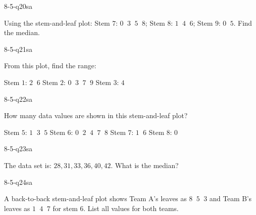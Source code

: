 \begin{practiceQuestion}{8-5-q20}{sa}
\begin{questionText}
Using the stem-and-leaf plot: Stem $7$: $0\;\;3\;\;5\;\;8$; Stem $8$: $1\;\;4\;\;6$; Stem $9$: $0\;\;5$. Find the median.
\end{questionText}
\end{practiceQuestion}

\begin{practiceQuestion}{8-5-q21}{sa}
\begin{questionText}
From this plot, find the range:

Stem $1$: $2\;\;6$ \quad Stem $2$: $0\;\;3\;\;7\;\;9$ \quad Stem $3$: $4$
\end{questionText}
\end{practiceQuestion}

\begin{practiceQuestion}{8-5-q22}{sa}
\begin{questionText}
How many data values are shown in this stem-and-leaf plot?

Stem $5$: $1\;\;3\;\;5$ \quad Stem $6$: $0\;\;2\;\;4\;\;7\;\;8$ \quad Stem $7$: $1\;\;6$ \quad Stem $8$: $0$
\end{questionText}
\end{practiceQuestion}

\begin{practiceQuestion}{8-5-q23}{sa}
\begin{questionText}
The data set is: $28, 31, 33, 36, 40, 42$. What is the median?
\end{questionText}
\end{practiceQuestion}

\begin{practiceQuestion}{8-5-q24}{sa}
\begin{questionText}
A back-to-back stem-and-leaf plot shows Team A's leaves as $8\;\;5\;\;3$ and Team B's leaves as $1\;\;4\;\;7$ for stem $6$. List all values for both teams.
\end{questionText}
\end{practiceQuestion}

